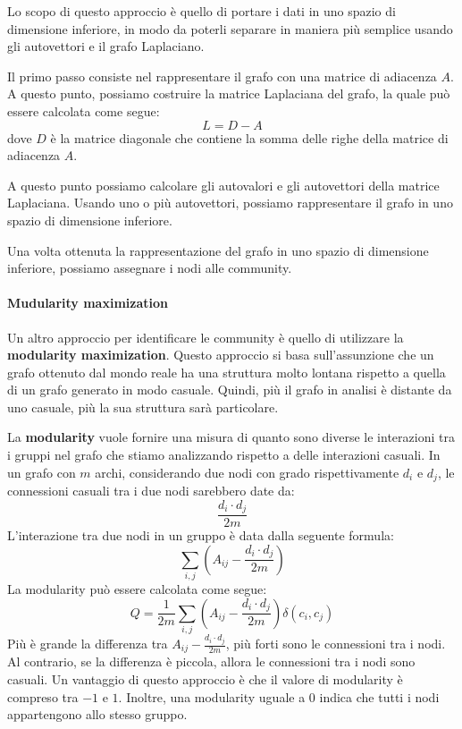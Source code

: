 Lo scopo di questo approccio è quello di portare i dati in uno spazio di dimensione
inferiore, in modo da poterli separare in maniera più semplice usando gli autovettori
e il grafo Laplaciano.

Il primo passo consiste nel rappresentare il grafo con una matrice di adiacenza
$A$. A questo punto, possiamo costruire la matrice Laplaciana del grafo, la quale
può essere calcolata come segue:
\begin{equation}
    L = D - A
\end{equation}
dove $D$ è la matrice diagonale che contiene la somma delle righe della matrice
di adiacenza $A$.

A questo punto possiamo calcolare gli autovalori e gli autovettori della matrice
Laplaciana. Usando uno o più autovettori, possiamo rappresentare il grafo in uno
spazio di dimensione inferiore. 

Una volta ottenuta la rappresentazione del grafo in uno spazio di dimensione 
inferiore, possiamo assegnare i nodi alle community.
\paragraph{Mudularity maximization}
Un altro approccio per identificare le community è quello di utilizzare la
\textbf{modularity maximization}. Questo approccio si basa sull'assunzione che 
un grafo ottenuto dal mondo reale ha una struttura molto lontana rispetto a 
quella di un grafo generato in modo casuale. Quindi, più il grafo in analisi è 
distante da uno casuale, più la sua struttura sarà particolare.

La \textbf{modularity} vuole fornire una misura di quanto sono diverse le 
interazioni tra i gruppi nel grafo che stiamo analizzando rispetto a delle 
interazioni casuali. In un grafo con $m$ archi, considerando due nodi con grado 
rispettivamente $d_i$ e $d_j$, le connessioni casuali tra i due nodi sarebbero
date da:
\begin{equation}
    \frac{d_i \cdot d_j}{2m}
\end{equation}
L'interazione tra due nodi in un gruppo è data dalla seguente formula:
\begin{equation}
    \sum_{i, j}\left(A_{ij} - \frac{d_i \cdot d_j}{2m}\right)
\end{equation}
La modularity può essere calcolata come segue:
\begin{equation}
    Q = \frac{1}{2m} \sum_{i, j} \left( A_{ij} - \frac{d_i \cdot d_j}{2m} \right) \delta(c_i, c_j)
\end{equation}
Più è grande la differenza tra $A_{ij} - \frac{d_i \cdot d_j}{2m}$, più forti 
sono le connessioni tra i nodi. Al contrario, se la differenza è piccola,
allora le connessioni tra i nodi sono casuali.
Un vantaggio di questo approccio è che il valore di modularity è compreso tra 
$-1$ e $1$. Inoltre, una modularity uguale a $0$ indica che tutti i nodi 
appartengono allo stesso gruppo.

